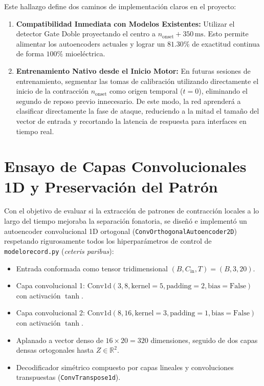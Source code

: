 \documentclass[11pt,a4paper,openany]{book}
\theoremstyle{definition}
\begin{document}
Este hallazgo define dos caminos de implementación claros en el proyecto:
\begin{enumerate}
    \item \textbf{Compatibilidad Inmediata con Modelos Existentes:} Utilizar el detector Gate Doble proyectando el centro a $n_{\text{onset}} + 350\,\text{ms}$. Esto permite alimentar los autoencoders actuales y lograr un $81.30\%$ de exactitud continua de forma $100\%$ mioeléctrica.
    \item \textbf{Entrenamiento Nativo desde el Inicio Motor:} En futuras sesiones de entrenamiento, segmentar las tomas de calibración utilizando directamente el inicio de la contracción $n_{\text{onset}}$ como origen temporal ($t = 0$), eliminando el segundo de reposo previo innecesario. De este modo, la red aprenderá a clasificar directamente la fase de ataque, reduciendo a la mitad el tamaño del vector de entrada y recortando la latencia de respuesta para interfaces en tiempo real.
\end{enumerate}

\section{Ensayo de Capas Convolucionales 1D y Preservación del Patrón}
\label{sec:ensayo_convolucional}

Con el objetivo de evaluar si la extracción de patrones de contracción locales a lo largo del tiempo mejoraba la separación fonatoria, se diseñó e implementó un autoencoder convolucional 1D ortogonal (\texttt{ConvOrthogonalAutoencoder2D}) respetando rigurosamente todos los hiperparámetros de control de \texttt{modelorecord.py} (\textit{ceteris paribus}):
\begin{itemize}
    \item Entrada conformada como tensor tridimensional $(B, C_{\text{in}}, T) = (B, 3, 20)$.
    \item Capa convolucional 1: $\text{Conv1d}(3, 8, \text{kernel}=5, \text{padding}=2, \text{bias}=\text{False})$ con activación $\tanh$.
    \item Capa convolucional 2: $\text{Conv1d}(8, 16, \text{kernel}=3, \text{padding}=1, \text{bias}=\text{False})$ con activación $\tanh$.
    \item Aplanado a vector denso de $16 \times 20 = 320$ dimensiones, seguido de dos capas densas ortogonales hasta $Z \in \mathbb{R}^2$.
    \item Decodificador simétrico compuesto por capas lineales y convoluciones transpuestas (\texttt{ConvTranspose1d}).
\end{itemize}
\end{document}
